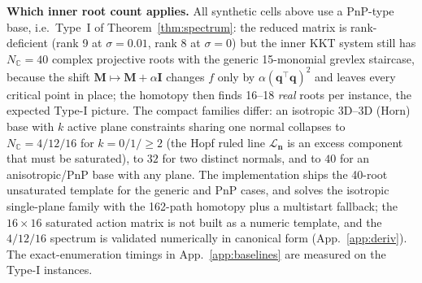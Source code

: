 \textbf{Which inner root count applies.} All synthetic cells above use a PnP-type base, i.e.\ Type~I of Theorem~\ref{thm:spectrum}: the reduced matrix is rank-deficient (rank 9 at $\sigma=0.01$, rank 8 at $\sigma=0$) but the inner KKT system still has $N_{\mathbb C}=40$ complex projective roots with the generic 15-monomial grevlex staircase, because the shift $\mathbf M\mapsto\mathbf M+\alpha\mathbf I$ changes $f$ only by $\alpha(\mathbf q^\top\mathbf q)^2$ and leaves every critical point in place; the homotopy then finds 16--18 \emph{real} roots per instance, the expected Type-I picture. The compact families differ: an isotropic 3D--3D (Horn) base with $k$ active plane constraints sharing one normal collapses to $N_{\mathbb C}=4/12/16$ for $k=0/1/\ge2$ (the Hopf ruled line $\mathcal L_{\mathbf n}$ is an excess component that must be saturated), to $32$ for two distinct normals, and to $40$ for an anisotropic/PnP base with any plane. The implementation ships the 40-root unsaturated template for the generic and PnP cases, and solves the isotropic single-plane family with the 162-path homotopy plus a multistart fallback; the $16\times16$ saturated action matrix is not built as a numeric template, and the $4/12/16$ spectrum is validated numerically in canonical form (App.~\ref{app:deriv}). The exact-enumeration timings in App.~\ref{app:baselines} are measured on the Type-I instances.

